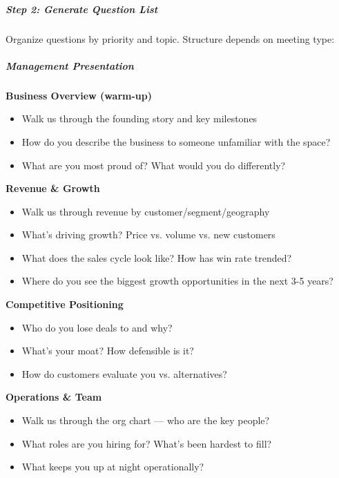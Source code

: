 \documentclass[11pt]{article}
\begin{document}
\subparagraph{Step 2: Generate Question List}\mbox{}\par

Organize questions by priority and topic. Structure depends on meeting type:


\subparagraph{Management Presentation}\mbox{}\par
\textbf{Business Overview (warm-up)}

\begin{itemize}[leftmargin=*,itemsep=2pt,topsep=2pt]
\item {} Walk us through the founding story and key milestones
\item {} How do you describe the business to someone unfamiliar with the space?
\item {} What are you most proud of? What would you do differently?
\end{itemize}

\textbf{Revenue \& Growth}

\begin{itemize}[leftmargin=*,itemsep=2pt,topsep=2pt]
\item {} Walk us through revenue by customer/segment/geography
\item {} What's driving growth? Price vs. volume vs. new customers
\item {} What does the sales cycle look like? How has win rate trended?
\item {} Where do you see the biggest growth opportunities in the next 3-5 years?
\end{itemize}

\textbf{Competitive Positioning}

\begin{itemize}[leftmargin=*,itemsep=2pt,topsep=2pt]
\item {} Who do you lose deals to and why?
\item {} What's your moat? How defensible is it?
\item {} How do customers evaluate you vs. alternatives?
\end{itemize}

\textbf{Operations \& Team}

\begin{itemize}[leftmargin=*,itemsep=2pt,topsep=2pt]
\item {} Walk us through the org chart — who are the key people?
\item {} What roles are you hiring for? What's been hardest to fill?
\item {} What keeps you up at night operationally?
\end{itemize}
\end{document}
